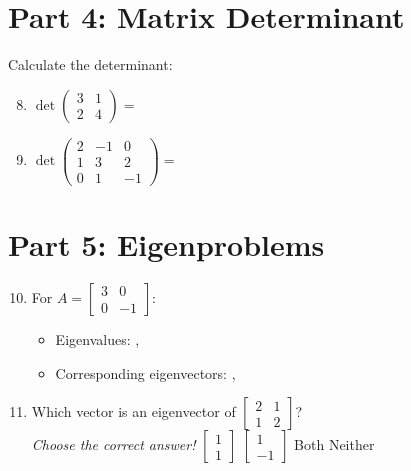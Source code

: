 \documentclass{article}
\begin{document}
\section*{Part 4: Matrix Determinant}
Calculate the determinant:

\begin{enumerate}
	\setcounter{enumi}{7}
	\item $\det\begin{pmatrix} 3 & 1 \\ 2 & 4 \end{pmatrix} = $ \underline{\hspace{3cm}}
	
	\item $\det\begin{pmatrix} 2 & -1 & 0 \\ 1 & 3 & 2 \\ 0 & 1 & -1 \end{pmatrix} = $ \underline{\hspace{3cm}}
\end{enumerate}

\newpage
\section*{Part 5: Eigenproblems}
\begin{enumerate}
	\setcounter{enumi}{9}
	\item For $A = \begin{bmatrix} 3 & 0 \\ 0 & -1 \end{bmatrix}$:
	\begin{itemize}
		\item Eigenvalues: \underline{\hspace{1cm}}, \underline{\hspace{1cm}}
		\item Corresponding eigenvectors: \underline{\hspace{3cm}}, \underline{\hspace{3cm}}
	\end{itemize}
	
	\item Which vector is an eigenvector of $\begin{bmatrix} 2 & 1 \\ 1 & 2 \end{bmatrix}$? \\ \textit{Choose the correct answer!}
	\bigskip
	$\begin{bmatrix} 1 \\ 1 \end{bmatrix}$ \hspace{0.5cm} $\begin{bmatrix} 1 \\ -1 \end{bmatrix}$ \hspace{0.5cm} Both \hspace{0.5cm} Neither
\end{enumerate}
\end{document}
